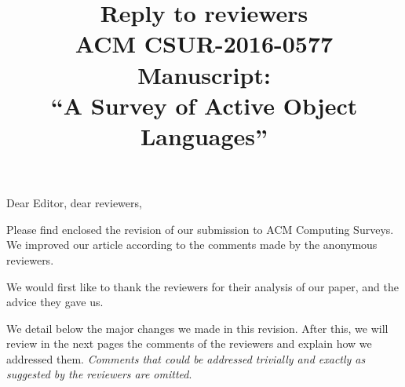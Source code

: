 \documentclass{article}
\title{Reply to reviewers\\
ACM CSUR-2016-0577 Manuscript: \\``A Survey of Active Object Languages'' }
\begin{document}
\maketitle
\noindent
Dear Editor, dear reviewers,

Please find enclosed the revision of our submission to ACM Computing
Surveys. We improved our article according to the comments made by the
anonymous reviewers.

We would first like to thank the reviewers for their analysis of our
paper, and the advice they gave us.

We detail below the major changes we made in this revision. After
this, we will review in the next pages the comments of the reviewers
and explain how we addressed them.  \emph{Comments that could be
  addressed trivially and exactly as suggested by the reviewers are
  omitted}.  \bigskip
\end{document}
